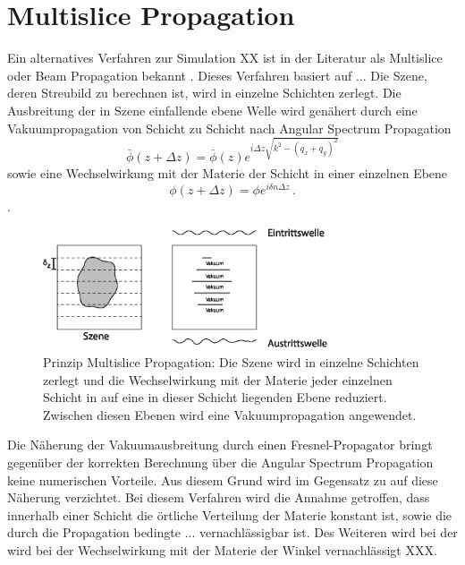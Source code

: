 \section{Multislice Propagation}
	Ein alternatives Verfahren zur Simulation XX ist in der Literatur als Multislice oder Beam Propagation bekannt \cite{hare1994,cowley1957}. Dieses Verfahren basiert auf ...
	Die Szene, deren Streubild zu berechnen ist, wird in einzelne Schichten zerlegt.
	Die Ausbreitung der in Szene einfallende ebene Welle wird genähert durch eine Vakuumpropagation von Schicht zu Schicht nach Angular Spectrum Propagation
	\begin{equation}
\bar{\phi}\left(z+\Delta z\right)=\bar{\phi}(z)e^{i\Delta z\sqrt{k^2-(q_x+q_y)^2}}
	\end{equation}
	sowie eine Wechselwirkung mit der Materie der Schicht in einer einzelnen Ebene
	\begin{equation}
		\phi(z+\Delta z)=\phi e^{i\delta n \Delta z} \, .
	\end{equation}.
	
	\begin{figure}
		\centering
		\includegraphics[width=0.75\textwidth]{images/multislice.eps}
		\caption[Prinzip Multislice Propagation]{Prinzip Multislice Propagation: Die Szene wird in einzelne Schichten zerlegt und die Wechselwirkung mit der Materie jeder einzelnen Schicht in auf eine in dieser Schicht liegenden Ebene reduziert. Zwischen diesen Ebenen wird eine Vakuumpropagation angewendet.}
		\label{fig:multislice}
	\end{figure} 
	
	Die Näherung der Vakuumausbreitung durch einen Fresnel-Propagator bringt gegenüber der korrekten Berechnung über die Angular Spectrum Propagation keine numerischen Vorteile. Aus diesem Grund wird im Gegensatz zu \cite{hare1994} auf diese Näherung verzichtet. 
	Bei diesem Verfahren wird die Annahme getroffen, dass  innerhalb einer Schicht die örtliche Verteilung der Materie konstant ist, sowie die durch die Propagation bedingte ... vernachlässigbar ist\cite{hare1994}. Des Weiteren wird bei der wird bei der Wechselwirkung mit der Materie der Winkel vernachlässigt XXX.
	
